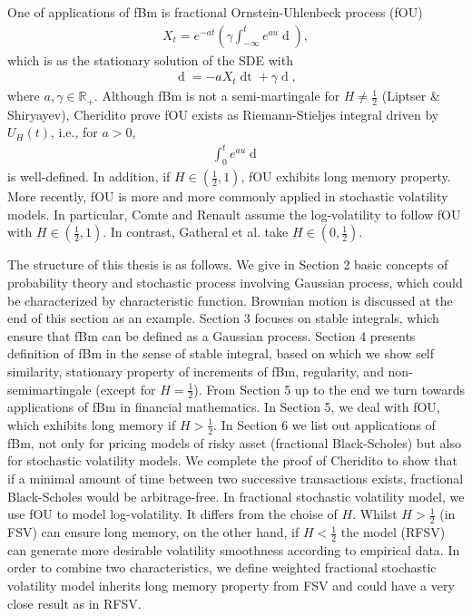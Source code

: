 \documentclass[a4paper, twoside, 11pt]{article}
\theoremstyle{definition}
\newcommand{\brkt}[1]{\left({#1} \right)}
\begin{document}
One of applications of fBm is fractional Ornstein-Uhlenbeck process (fOU) 
\begin{eqnarray*}
  X_t = e^{-at}\brkt{\gamma\int_{-\infty}^t e^{au}\mathop{dU_H(u)}},
\end{eqnarray*}
which is as the stationary solution of the SDE with 
\begin{eqnarray*}
  \mathop{dX_t} = -aX_t\mathop{dt} + \gamma\mathop{dU_H(t)},
\end{eqnarray*}
where $a,\gamma \in \mathbb{R}_+$. Although fBm is not a semi-martingale for $H\neq \frac{1}{2}$ (Liptser \& Shiryayev\cite{liptshir}), Cheridito prove fOU exists as Riemann-Stieljes integral driven by $U_H(t)$, i.e., for $a>0$,
\begin{eqnarray*}
  \int_{0}^t e^{au}\mathop{dU_H(u)}
\end{eqnarray*}
is well-defined. In addition, if $H\in(\frac{1}{2}, 1)$, fOU exhibits long memory property. More recently, fOU is more and more commonly applied in stochastic volatility models. In particular, Comte and Renault\cite{comren} assume the log-volatility to follow fOU with $H\in(\frac{1}{2}, 1)$. In contrast, Gatheral et al.\cite{Gatheral} take $H \in (0, \frac{1}{2})$.

  The structure of this thesis is as follows. We give in Section 2 basic concepts of probability theory and stochastic process involving Gaussian process, which could be characterized by characteristic function. Brownian motion is discussed at the end of this section as an example. Section 3 focuses on stable integrals, which ensure that fBm can be defined as a Gaussian process. Section 4 presents definition of fBm in the sense of stable integral, based on which we show self similarity, stationary property of increments of fBm, regularity, and non-semimartingale (except for $H=\frac{1}{2}$). From Section 5 up to the end we turn towards applications of fBm in financial mathematics. In Section 5, we deal with fOU, which exhibits long memory if $H > \frac{1}{2}$. In Section 6 we list out applications of fBm, not only for pricing models of risky asset (fractional Black-Scholes)  but also for stochastic volatility models. We complete the proof of Cheridito to show that if a minimal amount of time between two successive transactions exists, fractional Black-Scholes would be arbitrage-free. In fractional stochastic volatility model, we use fOU to model log-volatility. It differs from the choise of $H$. Whilst $H>\frac{1}{2}$ (in FSV) can ensure long memory, on the other hand, if $H < \frac{1}{2}$ the model (RFSV) can generate more desirable volatility smoothness according to empirical data. In order to combine two characteristics, we define weighted fractional stochastic volatility model inherits long memory property from FSV and could have a very close result as in RFSV.
\end{document}
